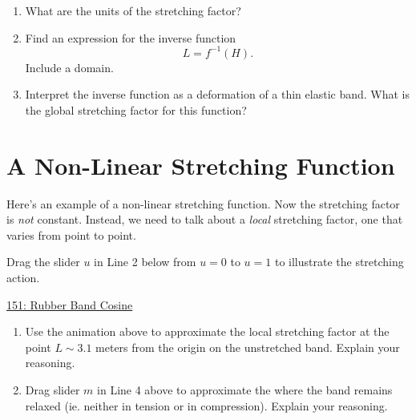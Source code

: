 \documentclass{ximera}
\begin{document}
\begin{question}  \label{Q:LDJJNMDesd}
\begin{enumerate}
\item What are the units of the stretching factor?
\begin{freeResponse}
\end{freeResponse}

\item Find an expression for the inverse function
\[
      L = f^{-1}(H).
\]
Include a domain. 

\item Interpret the inverse function as a deformation of a thin elastic band. What is the global stretching factor for this function?
\begin{freeResponse}
\end{freeResponse}
\end{enumerate}
\end{question}



\section{A Non-Linear Stretching Function}
Here's an example of a non-linear stretching function. Now the stretching factor is \emph{not} constant. Instead, we need to talk about a \emph{local} stretching factor, one that varies from point to point. 

\begin{exploration} \label{ExLdfdfthyhhhf}
Drag the slider $u$ in Line 2 below from $u=0$ to $u=1$ to illustrate the stretching action.
\begin{onlineOnly}
    \begin{center}
\end{center}
\end{onlineOnly}

\href{https://www.desmos.com/calculator/hqvyhormhf}{151: Rubber Band Cosine}

\end{exploration}

\begin{question} \label{Q:9887dfsdfdsf}
\begin{enumerate}
\item Use the animation above to approximate the local stretching factor at the point $L\sim 3.1$ meters from the origin on the unstretched band. Explain your reasoning.

\item Drag slider $m$ in Line 4 above to approximate the where the band remains relaxed (ie. neither in tension or in compression). Explain your reasoning.
\end{enumerate}
\end{question}
\end{document}
